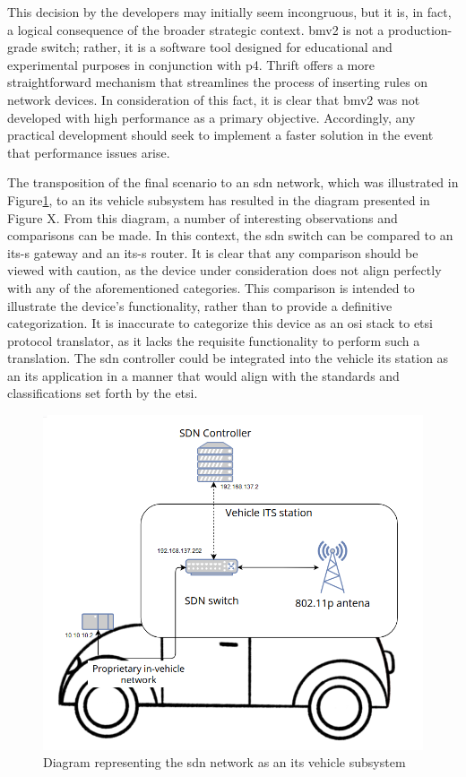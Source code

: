 This decision by the developers may initially seem incongruous, but it is, in fact, a logical consequence of the broader strategic context. \gls{bmv2} is not a production-grade switch; rather, it is a software tool designed for educational and experimental purposes in conjunction with \gls{p4}. Thrift offers a more straightforward mechanism that streamlines the process of inserting rules on network devices. 
In consideration of this fact, it is clear that \gls{bmv2} was not developed with high performance as a primary objective. Accordingly, any practical development should seek to implement a faster solution in the event that performance issues arise.

The transposition of the final scenario to an \gls{sdn} network, which was illustrated in Figure\ref{fig:exp2_vehicle_subsystem}, to an \gls{its} vehicle subsystem has resulted in the diagram presented in Figure X. From this diagram, a number of interesting observations and comparisons can be made. 
In this context, the \gls{sdn} switch can be compared to an \gls{its-s} gateway and an \gls{its-s} router. It is clear that any comparison should be viewed with caution, as the device under consideration does not align perfectly with any of the aforementioned categories. This comparison is intended to illustrate the device's functionality, rather than to provide a definitive categorization. It is inaccurate to categorize this device as an \gls{osi} stack to \gls{etsi} protocol translator, as it lacks the requisite functionality to perform such a translation.
The \gls{sdn} controller could be integrated into the vehicle \gls{its} station as an \gls{its} application in a manner that would align with the standards and classifications set forth by the \gls{etsi}.

\begin{figure}
	\centering
	\includegraphics[width=\textwidth]{Chapters/Figures/tests/bmv2_phase_2/its_vehicle_diagram.PNG}
	\caption{Diagram representing the \gls{sdn} network as an \gls{its} vehicle subsystem}
	\label{fig:exp2_vehicle_subsystem}
\end{figure}

